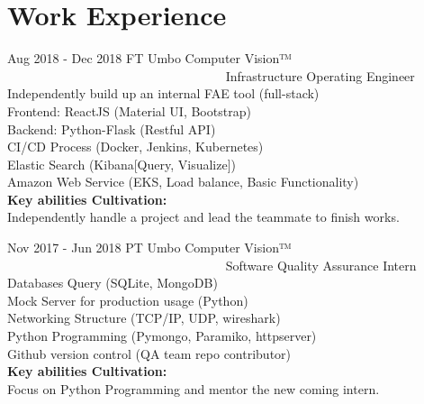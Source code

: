 \documentclass[10pt]{article} %
\begin{document}
\begin{paracol}{2}
\begin{flushleft}
\end{flushleft}
\medskip %


\section{Work Experience}

\workposition
	{Aug 2018 - Dec 2018}
	{FT}
	{Umbo Computer Vision™ \ \ \ \ \ \ \ \ \ \ \ \ \ \ \ \ \ \ \ \ \ \ \ \ \ \ \ \ \ \ \ \ \ \ }
	{Infrastructure Operating Engineer}
	{
		Independently build up an internal FAE tool (full-stack) \\
		Frontend: ReactJS (Material UI, Bootstrap) \\
		Backend: Python-Flask (Restful API) \\
		CI/CD Process (Docker, Jenkins, Kubernetes) \\
		Elastic Search (Kibana[Query, Visualize])\\
		Amazon Web Service (EKS, Load balance, Basic Functionality) \\
		\textbf{Key abilities Cultivation:}\\
		Independently handle a project and lead the teammate to finish works.} %

\workposition
	{Nov 2017 - Jun 2018}
	{PT}
	{Umbo Computer Vision™ \ \ \ \ \ \ \ \ \ \ \ \ \ \ \ \ \ \ \ \ \ \ \ \ \ \ \ \ \ \ \ \ \ \ }
	{Software Quality Assurance Intern}
	{
		Databases Query (SQLite, MongoDB) \\
		Mock Server for production usage (Python) \\
		Networking Structure (TCP/IP, UDP, wireshark) \\
		Python Programming (Pymongo, Paramiko, httpserver) \\
		Github version control (QA team repo contributor) \\
		\textbf{Key abilities Cultivation:}\\ 
		Focus on Python Programming and mentor the new coming intern.}  %
		


\end{paracol}
\end{document}

